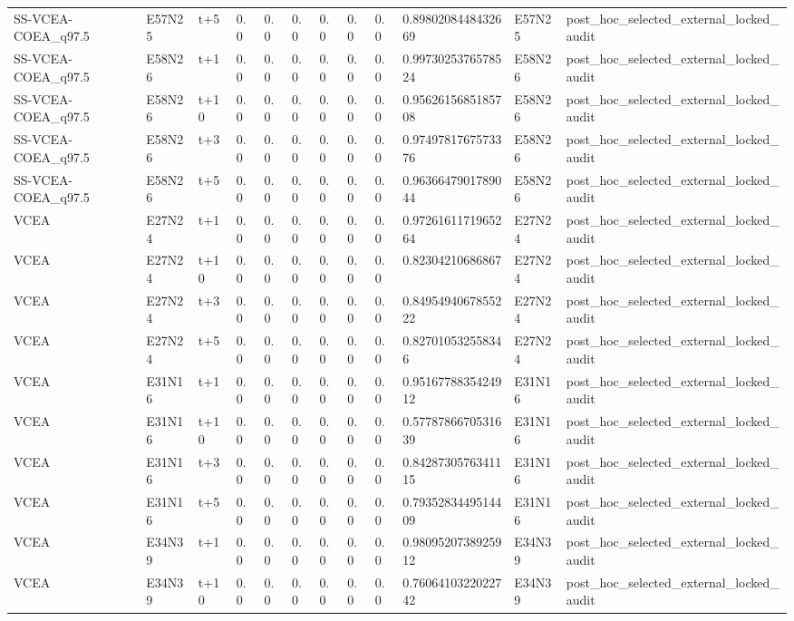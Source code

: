 \begin{landscape}
\begin{longtable}{llllllllllll}
SS-VCEA-COEA\_q97.5 & E57N25 & t+5 & 0.0 & 0.0 & 0.0 & 0.0 & 0.0 & 0.0 & 0.8980208448432669 & E57N25 & post\_hoc\_selected\_external\_locked\_audit \\
SS-VCEA-COEA\_q97.5 & E58N26 & t+1 & 0.0 & 0.0 & 0.0 & 0.0 & 0.0 & 0.0 & 0.9973025376578524 & E58N26 & post\_hoc\_selected\_external\_locked\_audit \\
SS-VCEA-COEA\_q97.5 & E58N26 & t+10 & 0.0 & 0.0 & 0.0 & 0.0 & 0.0 & 0.0 & 0.9562615685185708 & E58N26 & post\_hoc\_selected\_external\_locked\_audit \\
SS-VCEA-COEA\_q97.5 & E58N26 & t+3 & 0.0 & 0.0 & 0.0 & 0.0 & 0.0 & 0.0 & 0.9749781767573376 & E58N26 & post\_hoc\_selected\_external\_locked\_audit \\
SS-VCEA-COEA\_q97.5 & E58N26 & t+5 & 0.0 & 0.0 & 0.0 & 0.0 & 0.0 & 0.0 & 0.9636647901789044 & E58N26 & post\_hoc\_selected\_external\_locked\_audit \\
VCEA & E27N24 & t+1 & 0.0 & 0.0 & 0.0 & 0.0 & 0.0 & 0.0 & 0.9726161171965264 & E27N24 & post\_hoc\_selected\_external\_locked\_audit \\
VCEA & E27N24 & t+10 & 0.0 & 0.0 & 0.0 & 0.0 & 0.0 & 0.0 & 0.82304210686867 & E27N24 & post\_hoc\_selected\_external\_locked\_audit \\
VCEA & E27N24 & t+3 & 0.0 & 0.0 & 0.0 & 0.0 & 0.0 & 0.0 & 0.8495494067855222 & E27N24 & post\_hoc\_selected\_external\_locked\_audit \\
VCEA & E27N24 & t+5 & 0.0 & 0.0 & 0.0 & 0.0 & 0.0 & 0.0 & 0.827010532558346 & E27N24 & post\_hoc\_selected\_external\_locked\_audit \\
VCEA & E31N16 & t+1 & 0.0 & 0.0 & 0.0 & 0.0 & 0.0 & 0.0 & 0.9516778835424912 & E31N16 & post\_hoc\_selected\_external\_locked\_audit \\
VCEA & E31N16 & t+10 & 0.0 & 0.0 & 0.0 & 0.0 & 0.0 & 0.0 & 0.5778786670531639 & E31N16 & post\_hoc\_selected\_external\_locked\_audit \\
VCEA & E31N16 & t+3 & 0.0 & 0.0 & 0.0 & 0.0 & 0.0 & 0.0 & 0.8428730576341115 & E31N16 & post\_hoc\_selected\_external\_locked\_audit \\
VCEA & E31N16 & t+5 & 0.0 & 0.0 & 0.0 & 0.0 & 0.0 & 0.0 & 0.7935283449514409 & E31N16 & post\_hoc\_selected\_external\_locked\_audit \\
VCEA & E34N39 & t+1 & 0.0 & 0.0 & 0.0 & 0.0 & 0.0 & 0.0 & 0.9809520738925912 & E34N39 & post\_hoc\_selected\_external\_locked\_audit \\
VCEA & E34N39 & t+10 & 0.0 & 0.0 & 0.0 & 0.0 & 0.0 & 0.0 & 0.7606410322022742 & E34N39 & post\_hoc\_selected\_external\_locked\_audit \\

\end{longtable}
\end{landscape}
